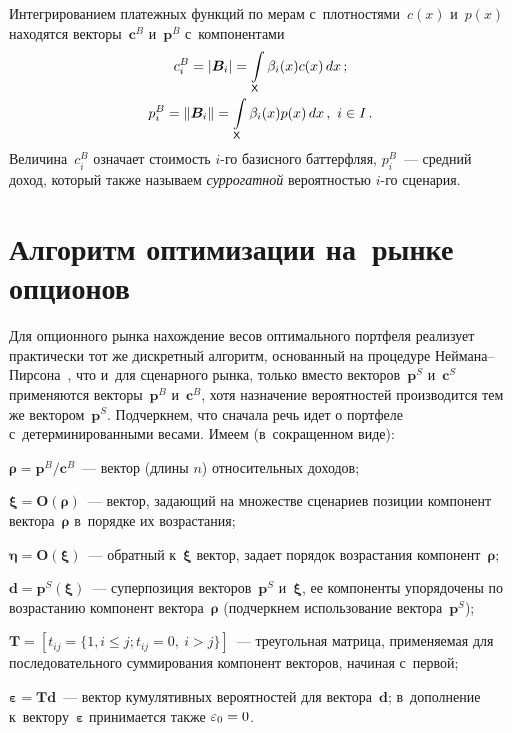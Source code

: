 \begin{multicols}{2}
  Интегрированием платежных функций по мерам с~плотностями~$c(x)$ 
и~$p(x)$ находятся векторы~$\boldsymbol{c}^B$ и~$\boldsymbol{p}^B$ 
с~компонентами 
  \begin{multline}
  c_i^B=\vert \boldsymbol{B}_i\vert =\int\limits_{\sf X} \beta_i(x) c(x) \,dx\,;\\
  p_i^B=\left\| \boldsymbol{B}_i\right\|=\int\limits_{\sf X} \beta_i(x) p(x)\,dx\,,\ 
i\in I\,.
  \label{e7-aga}
  \end{multline}
  Величина~$c_i^B$ означает стоимость $i$-го базисного баттерфляя, 
$p_i^B$~--- средний доход, который также называем \textit{суррогатной} 
вероятностью $i$-го сценария. %
  
  \section{Алгоритм оптимизации на~рынке опционов}
  
  Для опционного рынка нахождение весов оптимального портфеля реализует 
практически тот же дискретный алгоритм, основанный на процедуре  
Ней\-ма\-на--Пир\-со\-на~\cite{5-aga}, что и~для сценарного рынка, только 
вместо векторов~$\boldsymbol{p}^S$ и~$\boldsymbol{c}^S$ применяются 
векторы~$\boldsymbol{p}^B$ и~$\boldsymbol{c}^B$, хотя назначение 
вероятностей производится тем же вектором~$\boldsymbol{p}^S$. Подчеркнем, 
что сначала речь идет о портфеле с~детерминированными весами. Имеем 
(в~сокращенном виде): 
  \begin{description}
  \item $\boldsymbol{\rho} =\boldsymbol{p}^B/\boldsymbol{c}^B$~--- вектор 
(длины $n$) относительных доходов; 
  \item $\boldsymbol{\xi} = \mathbf{O}(\boldsymbol{\rho})$~--- вектор, 
задающий на множестве сценариев позиции компонент 
вектора~$\boldsymbol{\rho}$ в~порядке их возрастания; 
  \item $\boldsymbol{\eta} = \mathbf{O}(\boldsymbol{\xi})$~--- обратный 
к~$\boldsymbol{\xi}$ вектор, задает порядок возрастания 
компонент~$\boldsymbol{\rho}$;
  \item $\boldsymbol{d} = \boldsymbol{p}^S(\boldsymbol{\xi})$~--- суперпозиция 
векторов~$\boldsymbol{p}^S$ и~$\boldsymbol{\xi}$, ее компоненты 
упорядочены по возрастанию компонент вектора~$\boldsymbol{\rho}$ 
(подчеркнем использование вектора~$\boldsymbol{p}^S$);
  \item $\mathbf{T} = \left[t_{ij} = \{1, i\leq j; t_{ij} = 0,\ i>j\}\right]$~--- 
треугольная матрица, применяемая для последовательного суммирования 
компонент векторов, начиная с~первой;
  \item $\boldsymbol{\varepsilon} = \mathbf{T}\boldsymbol{d}$~--- вектор 
кумулятивных вероятностей для вектора~$\boldsymbol{d}$; в~дополнение 
к~вектору~$\boldsymbol{\varepsilon}$ принимается также $\varepsilon_0\hm = 0$. 
  \end{description}
  

\end{multicols}
